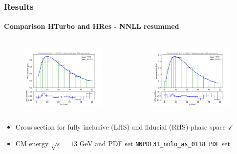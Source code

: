 \documentclass[aspectratio=43]{beamer}
\begin{document}
\begin{frame}
	
	\frametitle{Results}
	\framesubtitle{Comparison HTurbo and HRes - NNLL resummed}
	
	\footnotesize
	
	\begin{columns}
	
	
	\begin{figure}
		\includegraphics[width = 7cm]{plots/part3/chapter6/nnlo-res-1.png}
	\end{figure}
	
	
	\begin{figure}
		\includegraphics[width = 7cm]{plots/part3/chapter6/nnlo-res-fid-1.png}
	\end{figure}
	
	\end{columns}
	
	\begin{itemize}
	\item Cross section for fully inclusive (LHS) and fiducial (RHS) phase space {\color{darkgreen}$\checkmark$} 
	\item CM energy $\sqrt s = 13$ GeV and PDF set \texttt{NNPDF31\_nnlo\_as\_0118 PDF} set
	\end{itemize}

\end{frame}
\end{document}
